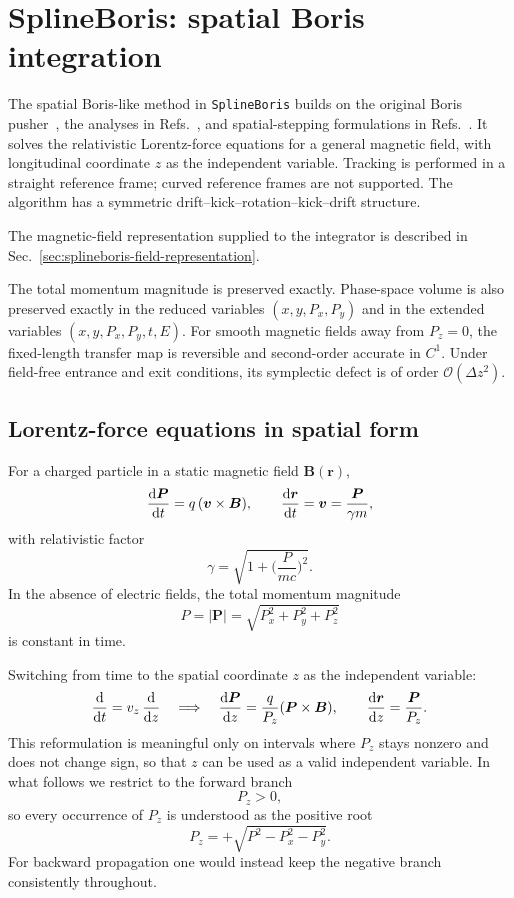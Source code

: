 \section{SplineBoris: spatial Boris integration}
\label{sec:spatial-boris}
\label{chapter:spatial-boris}

The spatial Boris-like method in \texttt{SplineBoris} builds on the original
Boris pusher~\cite{Boris1970}, the analyses in
Refs.~\cite{Qin2013,HairerLubich2018}, and spatial-stepping formulations in
Refs.~\cite{Stoltz2002,Penn2003}. It solves the relativistic Lorentz-force
equations for a general magnetic field, with longitudinal coordinate \(z\)
as the independent variable. Tracking is
performed in a straight reference frame; curved reference frames are not
supported. The algorithm has a symmetric
drift--kick--rotation--kick--drift structure.

The magnetic-field representation supplied to the integrator is described in
Sec.~\ref{sec:splineboris-field-representation}.

The total momentum magnitude is preserved exactly. Phase-space volume is
also preserved exactly in the reduced variables \((x,y,P_x,P_y)\)
and in the extended variables \((x,y,P_x,P_y,t,E)\). For
smooth magnetic fields away from \(P_z=0\), the fixed-length transfer map is
reversible and second-order accurate in \(C^1\). Under field-free entrance and
exit conditions, its symplectic defect is of order
\(\mathcal O(\Delta z^2)\).

\subsection{Lorentz-force equations in spatial form}
\label{boris:sec:lorentz}

For a charged particle in a static magnetic field \( \bm{B}(\bm{r}) \),
\[
\frac{\text{d} {\bm{P}}}{\text{d} {t}} = q\,(\bm{v}\times\bm{B}),
\qquad
\frac{\text{d} {\bm{r}}}{\text{d} {t}} = \bm{v} = \frac{\bm{P}}{\gamma m},
\]
with relativistic factor
\[
\gamma = \sqrt{1+\Big(\frac{P}{m c}\Big)^2}.
\]
In the absence of electric fields, the total momentum magnitude
\[
P = |\bm{P}| = \sqrt{P_x^2 + P_y^2 + P_z^2}
\]
is constant in time.

Switching from time to the spatial coordinate \(z\) as the independent variable:
\[
\frac{\text{d} {}}{\text{d} {t}} = v_z\,\frac{\text{d} {}}{\text{d} {z}}
\quad\Longrightarrow\quad
\frac{\text{d} {\bm{P}}}{\text{d} {z}} = \frac{q}{P_z}(\bm{P}\times\bm{B}),
\qquad
\frac{\text{d} {\bm{r}}}{\text{d} {z}} = \frac{\bm{P}}{P_z}.
\]
This reformulation is meaningful only on intervals where \(P_z\) stays
nonzero and does not change sign, so that \(z\) can be used as a valid
independent variable.
In what follows we restrict to the forward branch
\[
P_z>0,
\]
so every occurrence of \(P_z\) is understood as the positive root
\[
P_z = +\sqrt{P^2-P_x^2-P_y^2}.
\]
For backward propagation one would instead keep the negative branch
consistently throughout.

